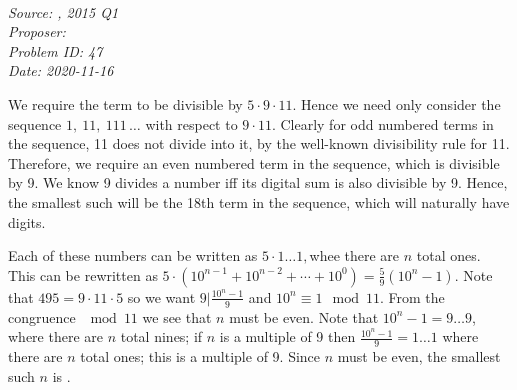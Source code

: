 \SSbreak\\
\emph{Source: \Cimom, 2015 Q1}\\
\emph{Proposer: \Pss}\\
\emph{Problem ID: 47}\\
\emph{Date: 2020-11-16}\\
\SSbreak
     
\bigskip

\begin{solution}\hfil\medskip

    We require the term to be divisible by \(5\cdot9\cdot 11\).
    Hence we need only consider the sequence \(1,\ 11,\ 111\,\ldots\) with respect to \(9\cdot11\).
    Clearly for odd numbered terms in the sequence, 11 does not divide into it, by the well-known divisibility rule for 11.
    Therefore, we require an even numbered term in the sequence, which is divisible by 9.
    We know 9 divides a number iff its digital sum is also divisible by 9.
    Hence, the smallest such will be the 18th term in the sequence, which will naturally have  digits. 
\end{solution}\bigskip

\begin{solution}\hfil\medskip
     
    Each of these numbers can be written as \(5\cdot1\ldots1,\)whee there are \(n\) total ones.
    This can be rewritten as \(5\cdot(10^{n-1}+10^{n-2}+\cdots+10^0)=\frac{5}{9}(10^n-1)\).
    Note that \(495=9\cdot11\cdot5\) so we want \(9|\frac{10^n-1}{9}\) and \(10^n\equiv1\mod{11}\).
    From the congruence \(\mod{11}\) we see that \(n\) must be even.
    Note that \(10^n-1=9\ldots9\), where there are \(n\) total nines; if \(n\) is a multiple of 9 then \(\frac{10^n-1}{9}=1\ldots1\) where there are \(n\) total ones; this is a multiple of 9.
    Since \(n\) must be even, the smallest such \(n\) is .
\end{solution}
